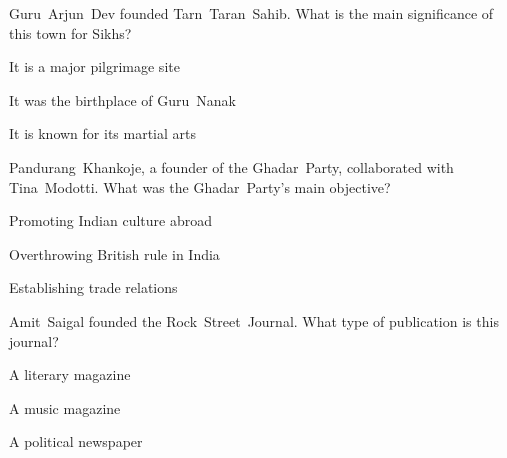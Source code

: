 \begin{enhancedmcq}{Guru Arjun Dev founded Tarn Taran Sahib. What is the main significance of this town for Sikhs?}
\item It is a major pilgrimage site
\item It was the birthplace of Guru Nanak
\item It is known for its martial arts

\end{enhancedmcq}
\begin{enhancedmcq}{Pandurang Khankoje, a founder of the Ghadar Party, collaborated with Tina Modotti. What was the Ghadar Party's main objective?}
\item Promoting Indian culture abroad
\item Overthrowing British rule in India
\item Establishing trade relations

\end{enhancedmcq}
\begin{enhancedmcq}{Amit Saigal founded the Rock Street Journal. What type of publication is this journal?}
\item A literary magazine
\item A music magazine
\item A political newspaper
\end{enhancedmcq}